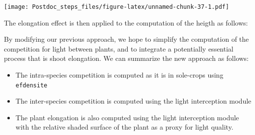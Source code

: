 \documentclass[
]{book}
\begin{document}
\texttt{[image: Postdoc\_steps\_files/figure-latex/unnamed-chunk-37-1.pdf]}

The elongation effect is then applied to the computation of the heigth as follows:

By modifying our previous approach, we hope to simplify the computation of the competition for light between plants, and to integrate a potentially essential process that is shoot elongation. We can summarize the new approach as follows:

\begin{itemize}
\item
  The intra-species competition is computed as it is in sole-crops using \texttt{efdensite}
\item
  The inter-species competition is computed using the light interception module
\item
  The plant elongation is also computed using the light interception module with the relative shaded surface of the plant as a proxy for light quality.
\end{itemize}

  
\end{document}
